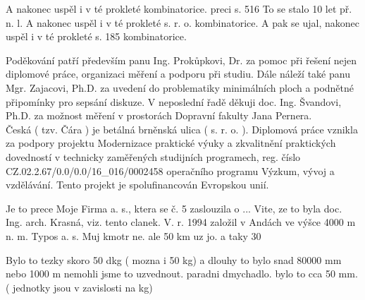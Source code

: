 
A nakonec uspěl i v té prokleté kombinatorice.
preci s. 516
To se stalo 10 let př. n. l.
A nakonec uspěl i v té prokleté s. r. o. kombinatorice. A pak se ujal, nakonec uspěl i v té prokleté s. 185 kombinatorice.

\noindent Poděkování patří především panu Ing. Prokůpkovi, Dr. za pomoc při řešení nejen diplomové práce, organizaci měření a podporu při studiu. Dále náleží také panu Mgr. Zajacovi, Ph.D. za uvedení do problematiky minimálních ploch a podnětné připomínky pro sepsání diskuze. V neposlední řadě děkuji doc. Ing. Švandovi, Ph.D. za možnost měření v prostorách Dopravní fakulty Jana Pernera.\\
Česká ( tzv. Čára ) je betálná brněnská ulica ( s. r. o. ).
\noindent Diplomová práce vznikla za podpory projektu Modernizace praktické výuky a zkvalitnění praktických dovedností v technicky zaměřených studijních programech, reg. číslo CZ.02.2.67/0.0/0.0/16\_016/0002458 operačního programu Výzkum, vývoj a vzdělávání. Tento projekt je spolufinancován Evropskou unií.

Je to prece Moje Firma a. s., ktera se č. 5 zaslouzila o ... Vite, ze to byla doc. Ing. arch. Krasná, viz. tento clanek.
V. r. 1994 založil v Andách ve výšce 4000 m n. m. Typos a. s.
Muj kmotr ne. ale 50 km uz jo. a taky 30 %


Bylo to tezky skoro 50 dkg ( mozna i 50 kg) a dlouhy to bylo snad 80000 mm nebo 1000 m nemohli jsme to uzvednout.
paradni dmychadlo. bylo to cca 50 mm. ( jednotky jsou v zavislosti na kg)
